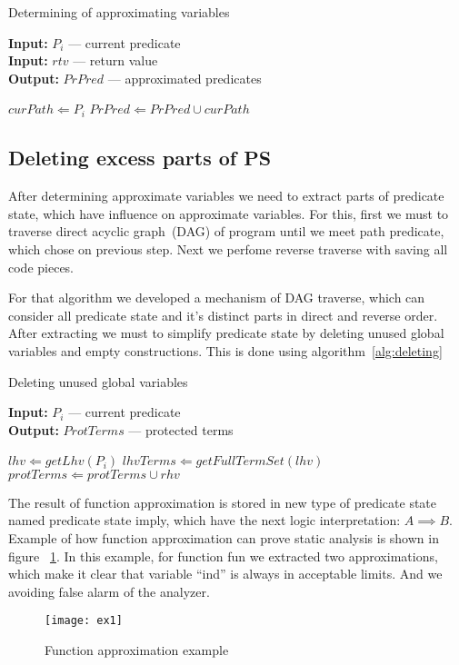 \begin{algorithm}[tbh]
\caption{Determining of approximating variables}
\label{alg:approx}

\textbf{Input:}  $P_i$  --- current predicate\\
\textbf{Input:}  $rtv$  --- return value\\
\textbf{Output:} $PrPred$ --- approximated predicates

\begin{algorithmic}
    \State $curPath \Leftarrow P_i$
\EndIf
{}
    \State $PrPred \Leftarrow PrPred \cup curPath$ 
\EndIf
\end{algorithmic}
\end{algorithm}

\subsection{Deleting excess parts of PS}
After determining approximate variables we need to extract parts of predicate state, which have influence on approximate variables. For this, first we must to traverse direct acyclic graph~(DAG) of program until we meet path predicate, which chose on previous step. Next we perfome reverse traverse with saving all code pieces.

For that algorithm we developed a mechanism of DAG traverse, which can consider all predicate state and it's distinct parts in direct and reverse order. After extracting we must to simplify predicate state by deleting unused global variables and empty constructions. This is done using algorithm~\ref{alg:deleting}

\begin{algorithm}[tbh]
\caption{Deleting unused global variables}
\label{alg:deleting}

\textbf{Input:}  $P_i$  --- current predicate\\
\textbf{Output:} $ProtTerms$ --- protected terms

\begin{algorithmic}
\State $lhv \Leftarrow getLhv(P_i)$
    \State $lhvTerms \Leftarrow getFullTermSet(lhv)$
    		\State $protTerms \Leftarrow protTerms \cup rhv$ 
    	\EndFor
    \EndIf
\EndIf
\end{algorithmic}
\end{algorithm}

The result of function approximation is stored in new type of predicate state named predicate state imply, which have the next logic interpretation: $A \implies B$. Example of how function approximation can prove static analysis is shown in figure ~\ref{fig:imply}. In this example, for function fun we extracted two approximations, which make it clear that variable ``ind'' is always in acceptable limits. And we avoiding false alarm of the analyzer.

\begin{figure}[tbh]
\centering
\caption{Function approximation example}
\label{fig:imply}
\texttt{[image: ex1]}
\end{figure}
